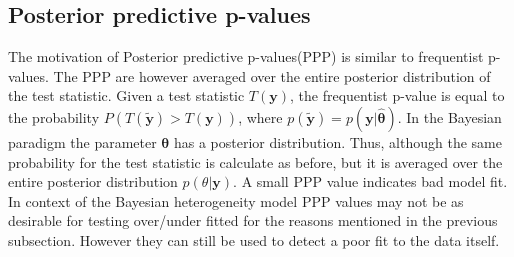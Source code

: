 \subsection{Posterior predictive p-values}
The motivation of Posterior predictive p-values(PPP) is similar to frequentist p-values. The PPP are however averaged over the entire posterior distribution of the test statistic. Given a test statistic $T(\boldsymbol{y})$, the frequentist p-value is equal to the probability $P(T(\boldsymbol{\tilde{y}}) > T(\boldsymbol{y}))$, where $p(\boldsymbol{\tilde{y}}) = p(\boldsymbol{y}|\boldsymbol{\hat{\theta}})$. In the Bayesian paradigm the parameter $\boldsymbol{\theta}$ has a posterior distribution. Thus, although the same probability for the test statistic is calculate as before, but it is averaged over the entire posterior distribution $p(\theta|\boldsymbol{y})$. A small PPP value indicates bad model fit. In context of the Bayesian heterogeneity model PPP values may not be as desirable for testing over/under fitted for the reasons mentioned in the previous subsection. However they can still be used to detect a poor fit to the data itself.
